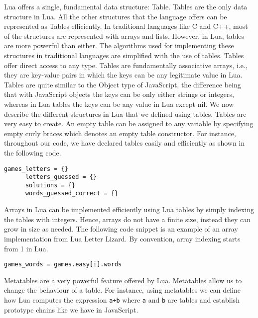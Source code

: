 Lua offers a single, fundamental data structure: Table. Tables are the only data structure in Lua. All the other structures that the language offers can be represented as Tables efficiently. In traditional languages like C and C++, most of the structures are represented with arrays and lists. However, in Lua, tables are more powerful than either. The algorithms used for implementing these structures in traditional languages are simplified with the use of tables. Tables offer direct access to any type. Tables are fundamentally associative arrays, i.e., they are key-value pairs in which the keys can be any legitimate value in Lua. Tables are quite similar to the Object type of JavaScript, the difference being that with JavaScript objects the keys can be only either strings or integers, whereas in Lua tables the keys can be any value in Lua except nil. We now describe the different structures in Lua that we defined using tables.
Tables are very easy to create. An empty table can be assigned to any variable by specifying empty curly braces which denotes an empty table constructor. For instance, throughout our code, we have declared tables easily and efficiently as shown in the following code.

\begin{lstlisting}[language={[5.2]Lua},caption=Declaring tables in LuaLetterlizard]
	  games_letters = {}
	  letters_guessed = {}
	  solutions = {}
	  words_guessed_correct = {}
\end{lstlisting}

Arrays in Lua can be implemented efficiently using Lua tables by simply indexing the tables with integers. Hence, arrays do not have a finite size, instead they can grow in size as needed. The following code snippet is an example of an array implementation from Lua Letter Lizard. By convention, array indexing starts from 1 in Lua.

\begin{lstlisting}[language={[5.2]Lua},caption={[An array in Lua]An array, \texttt{games.easy}, that holds pre-generated game puzzles and is easily accessed by indexing into the table}]
     games_words = games.easy[i].words
\end{lstlisting}

Metatables are a very powerful feature offered by Lua. Metatables allow us to change the behaviour of a table. For instance, using metatables we can define how Lua computes the expression \texttt{a+b} where \texttt{a} and \texttt{b} are tables and establish prototype chains like we have in JavaScript. 


